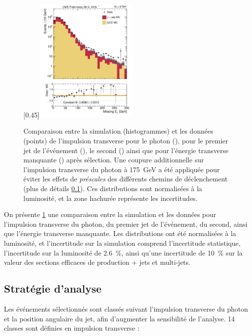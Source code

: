 \begin{figure}[p]
    \subcaptionbox{\label{met}}[0.45\textwidth]{\includegraphics[width=0.45\textwidth]{chapitre4/figs/MET_passedID_log.pdf}}
    \caption{Comparaison entre la simulation (histogrammes) et les données (points) de l'impulsion transverse pour le photon (), pour le premier jet de l'événement (), le second () ainsi que pour l'énergie transverse manquante () après sélection. Une coupure additionnelle sur l'impulsion transverse du photon à \SI{175}{\GeV} a été appliquée pour éviter les effets de \emph{préscales} des différents chemins de déclenchement (plus de détails \cref{sec:jetmet_strategy}). Ces distributions sont normalisées à la luminosité, et la zone hachurée représente les incertitudes.}
    \label{fig:pt_photon_jet}
\end{figure}

\bigskip

On présente \cref{fig:pt_photon_jet} une comparaison entre la simulation et les données pour l'impulsion transverse du photon, du premier jet de l'événement, du second, ainsi que l'énergie transverse manquante. Les distributions ont été normalisées à la luminosité, et l'incertitude sur la simulation comprend l'incertitude statistique, l'incertitude sur la luminosité de \SI{2.6}{\%}, ainsi qu'une incertitude de \SI{10}{\%} sur la valeur des sections efficaces de production \Pphoton + jets et multi-jets.

\subsection{Stratégie d'analyse} \label{sec:jetmet_strategy}

Les événements sélectionnés sont classés suivant l'impulsion transverse du photon et la position angulaire du jet, afin d'augmenter la sensibilité de l'analyse. 14 classes sont définies en impulsion transverse :

